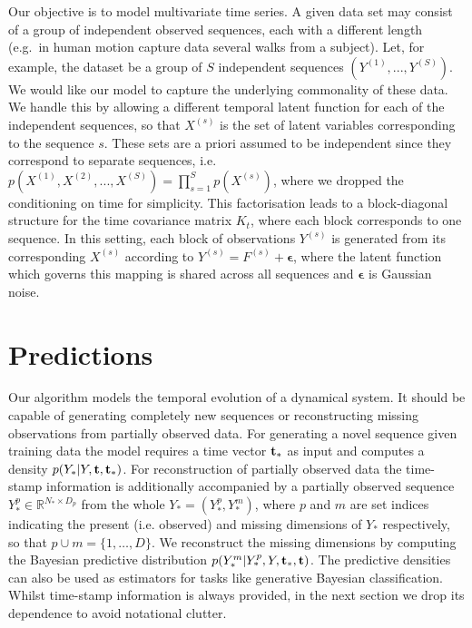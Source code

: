 \documentclass{article} %
\begin{document}
Our objective is to model multivariate time series. A given data set
may consist of a group of independent observed sequences, each with
a different length (e.g.\ in human motion capture data several walks
from a subject). Let, for example, the dataset be a group of
$S$ independent sequences  $\left( Y^{(1)}, ..., Y^{(S)} \right)$. We would like our model to capture the underlying
commonality of these data. We handle this by allowing a different temporal latent function for each of the independent
sequences, so that $X^{(s)}$ is the set of latent variables corresponding to the sequence $s$.
%
These sets are a priori assumed to be independent since they correspond to separate sequences, i.e.\ $p\left( X^{(1)}, X^{(2)}, ..., X^{(S)} \right) = \prod_{s=1}^S p(X^{(s)})$, where we dropped the
conditioning on time for simplicity.
%
This factorisation leads to a block-diagonal structure for the time covariance matrix $K_t$, where each block corresponds to one sequence.
 In this setting, each block of observations $Y^{(s)}$ is generated from its corresponding $X^{(s)}$
according to $Y^{(s)} = F^{(s)} + \boldsymbol \epsilon$, where the latent function which governs this mapping is shared across all sequences and 
$\boldsymbol \epsilon$ is Gaussian noise. 



\section{Predictions} 

Our algorithm models the temporal evolution of a dynamical system. It
should be capable of generating completely new sequences or
reconstructing missing observations from partially observed data. For
generating a novel sequence given training data the model requires a
time vector $\mathbf{t}_*$ as input and computes a density $p(Y_* | Y, \mathbf{t},
\mathbf{t}_*)$. For reconstruction of partially observed data the time-stamp
information is additionally accompanied by a partially observed
sequence $Y_*^{p} \in \mathbb{R}^{N_* \times D_p}$ from the whole $Y_*
= (Y_*^{p}, Y_*^{m})$, where $p$ and $m$ are set indices indicating
the present (i.e. observed) and missing dimensions of $Y_*$
respectively, so that $p \cup m= \{1,\ldots,D\}$.  We reconstruct the
missing dimensions by computing the Bayesian predictive distribution
$p(Y_*^{m}| Y_*^{p}, Y, \mathbf{t}_*, \mathbf{t})$. The predictive densities can
also be used as estimators for tasks like generative Bayesian
classification.
 Whilst time-stamp information is always provided, in the
next section we drop its dependence to avoid notational clutter.
\end{document}
